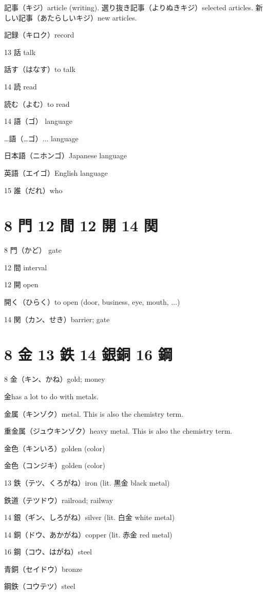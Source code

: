 記事（キジ）article (writing).
選り抜き記事（よりぬきキジ）selected articles.
新しい記事（あたらしいキジ）new articles.

記録（キロク）record

13 話 talk

話す（はなす）to talk

14 読 read

読む（よむ）to read

14 語（ゴ） language

…語（…ゴ）... language

日本語（ニホンゴ）Japanese language

英語（エイゴ）English language

15 誰（だれ）who

\section{8 門 12 間 12 開 14 関}

8 門（かど） gate

12 間 interval

12 開 open

開く（ひらく）to open (door, business, eye, mouth, ...)

14 関（カン、せき）barrier; gate

\section{8 金 13 鉄 14 銀銅 16 鋼}

8 金（キン、かね）gold; money

金has a lot to do with metals.

金属（キンゾク）metal. This is also the chemistry term.

重金属（ジュウキンゾク）heavy metal. This is also the chemistry term.

金色（キンいろ）golden (color)

金色（コンジキ）golden (color)

13 鉄（テツ、くろがね）iron (lit. 黒金 black metal)

鉄道（テツドウ）railroad; railway

14 銀（ギン、しろがね）silver (lit. 白金 white metal)

14 銅（ドウ、あかがね）copper (lit. 赤金 red metal)

16 鋼（コウ、はがね）steel

青銅（セイドウ）bronze

鋼鉄（コウテツ）steel
